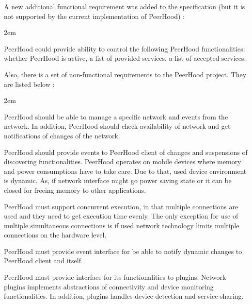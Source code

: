 %
A new additional functional requirement was added to the specification (but it is not supported by the current implementation of PeerHood) : 
\begin{description}
	\leftskip2em%
	\setlength{\itemsep}{0pt}%
	\setlength{\parsep}{0pt}%
	
	\item[User control] PeerHood could provide ability to control the following PeerHood functionalities: whether PeerHood is active, a list of provided services, a list of accepted services.
\end{description}

%
Also, there is a set of non-functional requirements to the PeerHood project. 
%
They are listed below : 
\begin{description}
	\leftskip2em%
	\setlength{\itemsep}{0pt}%
	\setlength{\parsep}{0pt}%
	
	\item[Network management] PeerHood should be able to manage a specific network and events from the network. 
	In addition, PeerHood should check availability of network and get notifications of changes of the network.

	\item[Component management] PeerHood should provide events to PeerHood client of changes and suspensions of discovering functionalities. 
	PeerHood operates on mobile devices where memory and power consumptions have to take care. 
	Due to that, used device environment is dynamic. 
	As, if network interface might go power saving state or it can be closed for freeing memory to other applications.

	\item[Communication concurrency base] PeerHood must support concurrent execution, in that multiple connections are used and they need to get execution time evenly. 
	The only exception for use of multiple simultaneous connections is if used network technology limits multiple connections on the hardware level.

	\item[Event interface] PeerHood must provide event interface for be able to notify dynamic changes to PeerHood client and itself.

	\item[Plugin architecture for networks] PeerHood must provide interface for its functionalities to plugins. 
	Network plugins implements abstractions of connectivity and device monitoring functionalities. 
	In addition, plugins handles device detection and service sharing.
\end{description}

